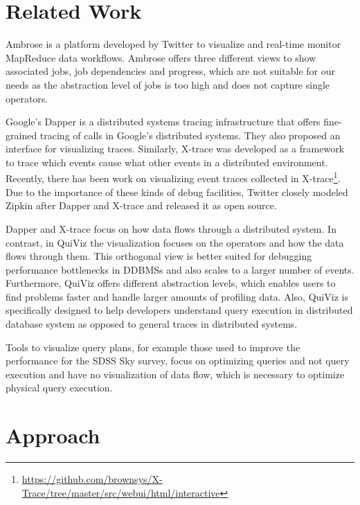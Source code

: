 \documentclass{chi2009}
\newcommand*{\system}{QuiViz\xspace}
\begin{document}


\section{Related Work}

Ambrose\cite{ambrose} is a platform developed by Twitter to visualize and
real-time monitor MapReduce data workflows. Ambrose
offers three different views to show associated jobs, job dependencies and
progress, which are not suitable for our needs as the abstraction level of jobs
is too high and does not capture single operators.

Google's Dapper\cite{sigelman2010dapper} is a distributed systems tracing
infrastructure that offers fine-grained tracing of calls in Google's distributed
systems. They also proposed an interface for visualizing traces. Similarly,
X-trace\cite{fonseca2007x} was developed as a framework to trace which events
cause what other events in a distributed environment. Recently, there has been
work on visualizing event traces collected in
X-trace\footnote{\url{https://github.com/brownsys/X-Trace/tree/master/src/webui/html/interactive}}.
Due to the importance of these kinds of debug facilities, Twitter closely
modeled Zipkin\cite{zipkin} after Dapper and X-trace and released it as open
source.

Dapper and X-trace focus on how data flows through a distributed system. In
contrast, in \system the visualization focuses on the operators and how the
data flows through them. This orthogonal view is better suited for debugging
performance bottlenecks in DDBMSs and also scales to a larger number of events.
Furthermore, \system offers different abstraction levels, which enables users
to find problems faster and handle larger amounts of profiling data. Also,
\system is specifically designed to help developers understand query execution
in distributed database system as opposed to general traces in distributed
systems.

Tools to visualize query plans, for example those used to improve the
performance for the SDSS Sky survey\cite{szalay2002sdss}, focus on optimizing
queries and not query execution and have no visualization of data flow, which
is necessary to optimize physical query execution.

\section{Approach}
\label{sec:approach}
\end{document}
